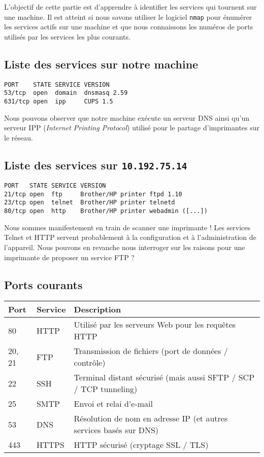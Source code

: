 \documentclass[11pt,a4paper]{article}
\begin{document}
L'objectif de cette partie est d'apprendre à identifier les services qui tournent sur une machine. Il est atteint si nous savons utiliser le logiciel \texttt{nmap} pour énumérer les services actifs sur une machine et que nous connaissons les numéros de ports utilisés par les services les plus courants.

\subsection{Liste des services sur notre machine}

\begin{verbatim}
PORT    STATE SERVICE VERSION
53/tcp  open  domain  dnsmasq 2.59
631/tcp open  ipp     CUPS 1.5
\end{verbatim}

Nous pouvons observer que notre machine exécute un serveur DNS ainsi qu'un serveur IPP (\textit{Internet Printing Protocol}) utilisé pour le partage d'imprimantes sur le réseau.

\subsection{Liste des services sur \texttt{10.192.75.14}}

\begin{verbatim}
PORT   STATE SERVICE VERSION
21/tcp open  ftp     Brother/HP printer ftpd 1.10
23/tcp open  telnet  Brother/HP printer telnetd
80/tcp open  http    Brother/HP printer webadmin ([...])
\end{verbatim}

Nous sommes manifestement en train de scanner une imprimante ! Les services Telnet et HTTP servent probablement à la configuration et à l'administration de l'appareil. Nous pouvons en revanche nous interroger sur les raisons pour une imprimante de proposer un service FTP ?

\subsection{Ports courants}

\begin{tabular}{|l|l|p{12cm}|}
	\hline
	\textbf{Port} & \textbf{Service} & \textbf{Description} \\
	\hline
	80    & HTTP & Utilisé par les serveurs Web pour les requêtes HTTP \\
	20, 21 & FTP & Transmission de fichiers (port de données / contrôle) \\
	22    & SSH & Terminal distant sécurisé (mais aussi SFTP / SCP / TCP tunneling) \\
	25    & SMTP & Envoi et relai d'e-mail \\
	53    & DNS & Résolution de nom en adresse IP (et autres services basés sur DNS) \\
	443   & HTTPS & HTTP sécurisé (cryptage SSL / TLS) \\
	\hline
\end{tabular}
\end{document}

